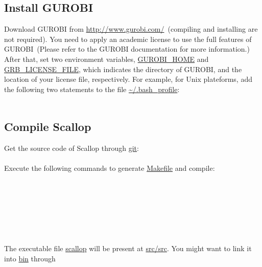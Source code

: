 \documentclass{llncs}
\begin{document}
\subsection{Install GUROBI}
Download GUROBI from \url{http://www.gurobi.com/}~(compiling and installing are not required).
You need to apply an academic license to use
the full features of GUROBI~(Please refer to the GUROBI documentation for more information.)
After that, set two environment
variables, \url{GUROBI_HOME} and \url{GRB_LICENSE_FILE}, which indicates the directory of GUROBI, and
the location of your license file, respectively.
For example, for Unix plateforms, add the following
two statements to the file \url{~/.bash_profile}:\\
\\

\subsection{Compile Scallop}
Get the source code of Scallop through \url{git}:\\
\\
Execute the following commands to generate \url{Makefile} and compile:\\
\\
\\
\\
\\
\\
\\
\\
The executable file \url{scallop} will be present at \url{src/src}.
You might want to link it into \url{bin} through\\
\\
\end{document}
